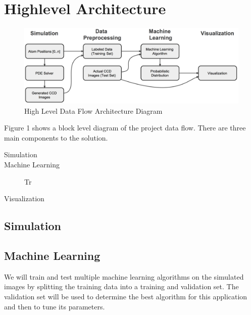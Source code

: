 \section{Highlevel Architecture}
\label{architecture}

\begin{figure}[h]
\begin{center}
\includegraphics[scale=0.4]{arch.png}
\caption{High Level Data Flow Architecture Diagram}
\label{fig:arch}
\end{center}
\end{figure}

\noindent Figure 1 shows a block level diagram of the project data flow. There are three main components to the solution.
\begin{description}
\item[Simulation] 
\item[Machine Learning] Tr
\item[Visualization]
\end{description}

\subsection{Simulation}

\subsection{Machine Learning}
We will train and test multiple machine learning algorithms on the simulated images by splitting the training data into a training and validation set.  The validation set will be used to determine the best algorithm for this application and then to tune its parameters.
 
